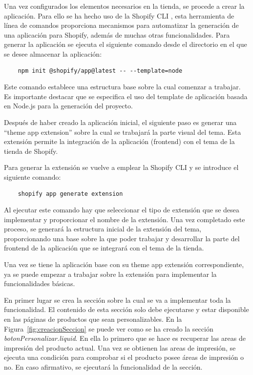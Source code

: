 \documentclass[12pt]{article}
\begin{document}
Una vez configurados los elementos necesarios en la tienda, se procede a crear la aplicación. Para ello se ha hecho uso de la Shopify CLI \cite{shopify-cli}, esta herramienta
de línea de comandos proporciona mecanismos para automatizar la generación de una aplicación para Shopify, además de muchas otras funcionalidades.
Para generar la aplicación se ejecuta el siguiente comando desde el directorio en el que se desee almacenar la aplicación: 
\begin{lstlisting}
    npm init @shopify/app@latest -- --template=node
\end{lstlisting}

Este comando establece una estructura base sobre la cual comenzar a trabajar. Es importante destacar que se especifica el uso del template de aplicación basada en Node.js 
para la generación del proyecto.

Después de haber creado la aplicación inicial, el siguiente paso es generar una ``theme app extension'' sobre la cual se trabajará la parte visual del tema. Esta
extensión permite la integración de la aplicación (frontend) con el tema de la tienda de Shopify.

Para generar la extensión se vuelve a emplear la Shopify CLI y se introduce el siguiente comando:

\begin{lstlisting}
    shopify app generate extension
\end{lstlisting}

Al ejecutar este comando hay que seleccionar el tipo de extensión que se desea implementar y proporcionar el nombre de la extensión. Una vez completado este proceso,
se generará la estructura inicial de la extensión del tema, proporcionando una base sobre la que poder trabajar y desarrollar la parte del frontend de la aplicación que se integrará con
el tema de la tienda.

Una vez se tiene la aplicación base con su theme app extensión correspondiente, ya se puede empezar a trabajar sobre la extensión para implementar la funcionalidades básicas.

En primer lugar se crea la sección sobre la cual se va a implementar toda la funcionalidad. El contenido de esta sección solo debe ejecutarse y estar disponible en las 
páginas de productos que sean personalizables. En la Figura~\ref{fig:creacionSeccion} se puede ver como se ha creado la sección \textit{botonPersonalizar.liquid}. En ella lo primero
que se hace es recuperar las areas de impresión del producto actual. Una vez se obtienen las areas de impresión, se ejecuta una condición para comprobar
si el producto posee áreas de impresión o no. En caso afirmativo, se ejecutará la funcionalidad de la sección.
\end{document}
